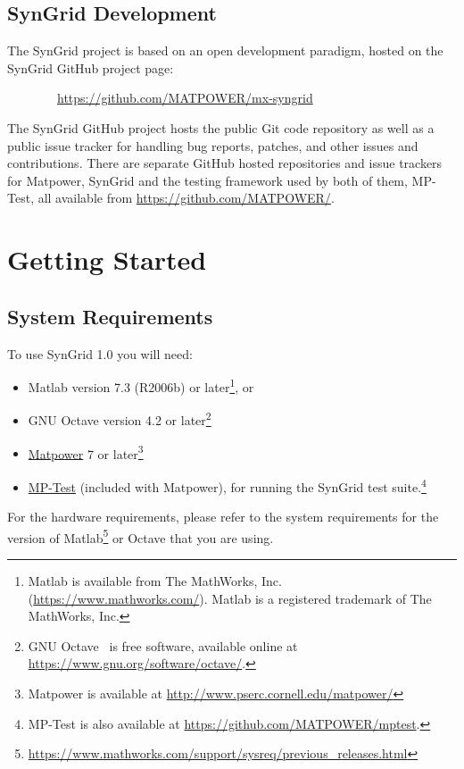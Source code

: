 \documentclass[12pt]{article}
\newcommand{\matlab}[0]{{\sc Matlab}}
\newcommand{\matpower}[0]{{\sc Matpower}}
\newcommand{\matpowerurl}[0]{http://www.pserc.cornell.edu/matpower/}
\newcommand{\matpowerlink}[0]{\href{\matpowerurl}{\matpower{}}}
\newcommand{\mptest}[0]{{MP-Test}}
\newcommand{\mptesturl}[0]{https://github.com/MATPOWER/mptest}
\newcommand{\mptestlink}[0]{\href{\mptesturl}{\mptest{}}}
\newcommand{\syngrid}[0]{{SynGrid}}
\newcommand{\syngridver}[0]{1.0}
\newcommand{\syngridurl}[0]{https://github.com/MATPOWER/mx-syngrid}
\numberwithin{equation}{section}
\numberwithin{table}{section}
\numberwithin{figure}{section}
\begin{document}
\subsection{\syngrid{} Development}
\label{sec:development}

The \syngrid{} project is based on an open development paradigm, hosted on the \syngrid{} GitHub project page:

\bigskip

~~~~~~~~\url{\syngridurl}

\bigskip

The \syngrid{} GitHub project hosts the public Git code repository as well as a public issue tracker for handling bug reports, patches, and other issues and contributions. There are separate GitHub hosted repositories and issue trackers for \matpower{}, \syngrid{} and the testing framework used by both of them, \mptest{}, all available from \url{https://github.com/MATPOWER/}.


\section{Getting Started}

\subsection{System Requirements}
\label{sec:sysreq}
To use \syngrid{} \syngridver{} you will need:
\begin{itemize}
\item \matlab{}\textsuperscript{\tiny \textregistered} version 7.3 (R2006b) or later\footnote{\matlab{} is available from The MathWorks, Inc. (\url{https://www.mathworks.com/}). \matlab{} is a registered trademark of The MathWorks, Inc.}, or
\item GNU Octave version 4.2 or later\footnote{GNU Octave~\cite{octave} is free software, available online at \url{https://www.gnu.org/software/octave/}.}
\item \matpowerlink{} 7 or later\footnote{\matpower{} is available at \url{\matpowerurl}}
\item \mptestlink{} (included with \matpower{}), for running the \syngrid{} test suite.\footnote{\mptest{} is also available at \url{\mptesturl}.}
\end{itemize}

For the hardware requirements, please refer to the system requirements for the version of \matlab{}\footnote{\url{https://www.mathworks.com/support/sysreq/previous_releases.html}} or Octave that you are using.
\end{document}
